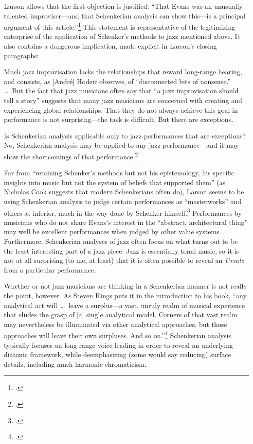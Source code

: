 Larson allows that the first objection is justified: “That Evans was an
unusually talented improviser---and that Schenkerian analysis can show
this---is a principal argument of this article.”\footcite[239]{larson:1998}
This statement is representative of the legitimizing enterprise of the
application of Schenker’s methods to jazz mentioned above. It also contains a
dangerous implication, made explicit in Larson’s closing paragraphs:
\begin{quoting}
  \singlespacing
  Much jazz improvisation lacks the relationships that reward long-range
  hearing, and consists, as [André] Hodeir observes, of “disconnected bits of
  nonsense.” \ldots\ But the fact that jazz musicians often say that “a jazz
  improvisation should tell a story” suggests that many jazz musicians are
  concerned with creating and experiencing global relationships. That they do
  not always achieve this goal in performance is not surprising---the task is
  difficult. But there are exceptions.

  Is Schenkerian analysis applicable only to jazz performances that are
  exceptions? No, Schenkerian analysis may be applied to any jazz
  performance---and it may show the shortcomings of that
  performance.\footcite[240--41]{larson:1998}
\end{quoting}

Far from “retaining Schenker’s methods but not his epistemology, his specific
insights into music but not the system of beliefs that supported them” (as
Nicholas Cook suggests that modern Schenkerians often do), Larson seems to be
using Schenkerian analysis to judge certain performances as “masterworks” and
others as inferior, much in the way done by Schenker
himself.\footcite[439]{cook:1989} Performances by musicians who do not share
Evans’s interest in the “abstract, architectural thing” may well be excellent
performances when judged by other value systems.  Furthermore,
Schenkerian analyses of jazz often focus on what turns out to be the least
interesting part of a jazz piece. Jazz is essentially tonal music, so it is
not at all surprising (to me, at least) that it is often possible to reveal
an \emph{Ursatz} from a particular performance.

Whether or not jazz musicians are thinking in a Schenkerian manner is not
really the point, however. As Steven Rings puts it in the introduction to his
book, “any analytical act will~\ldots\ leave a surplus---a vast, unruly realm
of musical experience that eludes the grasp of [a] single analytical model.
Corners of that vast realm may nevertheless be illuminated via other
analytical approaches, but those approaches will leave their own surpluses.
And so on.”\footcite[5]{rings:2011} Schenkerian analysis typically focuses on
long-range voice leading in order to reveal an underlying diatonic framework,
while deemphasizing (some would say reducing) surface details, including much
harmonic chromaticism.

